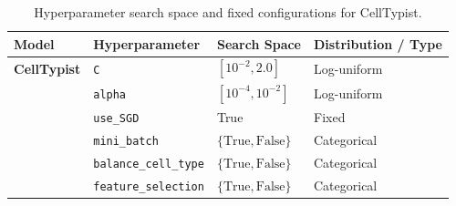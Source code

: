 \documentclass[11pt]{article}
\begin{document}
\begin{table}[htbp]
\centering
\caption{Hyperparameter search space and fixed configurations for CellTypist.}\label{tab:celltypist-hyperparameter-search-space}
\begin{tabular}{llll}
\toprule
\textbf{Model} & \textbf{Hyperparameter} & \textbf{Search Space} & \textbf{Distribution / Type} \\
\midrule
\textbf{CellTypist} & \texttt{C} & $[10^{-2}, 2.0]$ & Log-uniform \\
 & \texttt{alpha} & $[10^{-4}, 10^{-2}]$ & Log-uniform \\
 & \texttt{use\_SGD} & True & Fixed \\
 & \texttt{mini\_batch} & $\{\text{True}, \text{False}\}$ & Categorical \\
 & \texttt{balance\_cell\_type} & $\{\text{True}, \text{False}\}$ & Categorical \\
 & \texttt{feature\_selection} & $\{\text{True}, \text{False}\}$ & Categorical \\
\bottomrule
\end{tabular}
\end{table}
\end{document}
